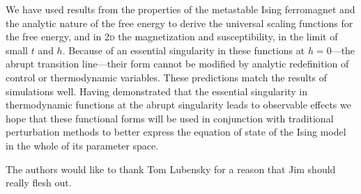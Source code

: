 \documentclass[aps,prl,reprint]{revtex4-1}
\begin{document}
We have used results from the properties of the metastable Ising ferromagnet
and the analytic nature of the free energy to derive the universal scaling
functions for the free energy, and in \textsc{2d} the magnetization and
susceptibility, in the limit of small $t$ and $h$. Because of an essential
singularity in these functions at $h=0$---the abrupt transition line---their
form cannot be modified by analytic redefinition of control or thermodynamic
variables. These predictions match the results of simulations well. Having
demonstrated that the essential singularity in thermodynamic functions at the
abrupt singularity leads to observable effects we hope that these functional
forms will be used in conjunction with traditional perturbation methods to
better express the equation of state of the Ising model in the whole of its
parameter space.

\begin{acknowledgments}
  The authors would like to thank Tom Lubensky for a reason that Jim should
  really flesh out.
\end{acknowledgments}


\end{document}
